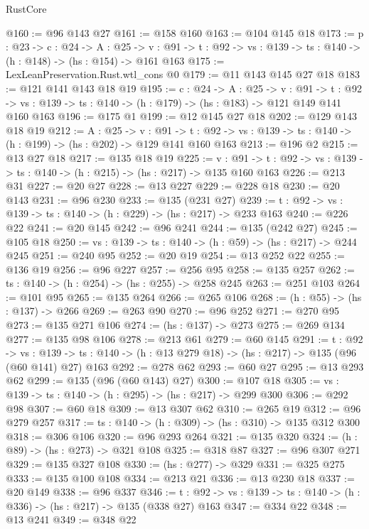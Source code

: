 \begin{lexlean}{RustCore}
\begin{coremodule}
@160 := @96 @143 @27
@161 := @158 @160
@163 := @104 @145 @18
@173 := {p : @23} ->
  {c : @24} ->
  {A : @25} ->
  {v : @91} -> {t : @92} -> {vs : @139} -> {ts : @140} -> (h : @148) -> (hs : @154) -> @161 @163
@175 := LexLeanPreservation.Rust.wtl_cons @0
@179 := @11 @143 @145 @27 @18
@183 := @121 @141 @143 @18 @19
@195 := {c : @24} ->
  {A : @25} ->
  {v : @91} ->
  {t : @92} -> {vs : @139} -> {ts : @140} -> (h : @179) -> (hs : @183) -> @121 @149 @141 @160 @163
@196 := @175 @1
@199 := @12 @145 @27 @18
@202 := @129 @143 @18 @19
@212 := {A : @25} ->
  {v : @91} ->
  {t : @92} -> {vs : @139} -> {ts : @140} -> (h : @199) -> (hs : @202) -> @129 @141 @160 @163
@213 := @196 @2
@215 := @13 @27 @18
@217 := @135 @18 @19
@225 := {v : @91} ->
  {t : @92} -> {vs : @139} -> {ts : @140} -> (h : @215) -> (hs : @217) -> @135 @160 @163
@226 := @213 @31
@227 := @20 @27
@228 := @13 @227
@229 := @228 @18
@230 := @20 @143
@231 := @96 @230
@233 := @135 (@231 @27)
@239 := {t : @92} -> {vs : @139} -> {ts : @140} -> (h : @229) -> (hs : @217) -> @233 @163
@240 := @226 @22
@241 := @20 @145
@242 := @96 @241
@244 := @135 (@242 @27)
@245 := @105 @18
@250 := {vs : @139} -> {ts : @140} -> (h : @59) -> (hs : @217) -> @244 @245
@251 := @240 @95
@252 := @20 @19
@254 := @13 @252 @22
@255 := @136 @19
@256 := @96 @227
@257 := @256 @95
@258 := @135 @257
@262 := {ts : @140} -> (h : @254) -> (hs : @255) -> @258 @245
@263 := @251 @103
@264 := @101 @95
@265 := @135 @264
@266 := @265 @106
@268 := (h : @55) -> (hs : @137) -> @266
@269 := @263 @90
@270 := @96 @252
@271 := @270 @95
@273 := @135 @271 @106
@274 := (hs : @137) -> @273
@275 := @269 @134
@277 := @135 @98 @106
@278 := @213 @61
@279 := @60 @145
@291 := {t : @92} ->
  {vs : @139} -> {ts : @140} -> (h : @13 @279 @18) -> (hs : @217) -> @135 (@96 (@60 @141) @27) @163
@292 := @278 @62
@293 := @60 @27
@295 := @13 @293 @62
@299 := @135 (@96 (@60 @143) @27)
@300 := @107 @18
@305 := {vs : @139} -> {ts : @140} -> (h : @295) -> (hs : @217) -> @299 @300
@306 := @292 @98
@307 := @60 @18
@309 := @13 @307 @62
@310 := @265 @19
@312 := @96 @279 @257
@317 := {ts : @140} -> (h : @309) -> (hs : @310) -> @135 @312 @300
@318 := @306 @106
@320 := @96 @293 @264
@321 := @135 @320
@324 := (h : @89) -> (hs : @273) -> @321 @108
@325 := @318 @87
@327 := @96 @307 @271
@329 := @135 @327 @108
@330 := (hs : @277) -> @329
@331 := @325 @275
@333 := @135 @100 @108
@334 := @213 @21
@336 := @13 @230 @18
@337 := @20 @149
@338 := @96 @337
@346 := {t : @92} -> {vs : @139} -> {ts : @140} -> (h : @336) -> (hs : @217) -> @135 (@338 @27) @163
@347 := @334 @22
@348 := @13 @241
@349 := @348 @22

\end{coremodule}
\end{lexlean}
